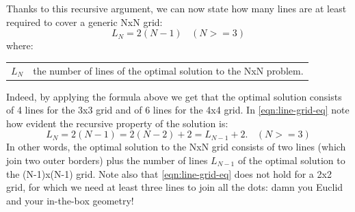 \documentclass[11pt]{article}
\makeatletter
\newenvironment{conditions}
  {\par\vspace{\abovedisplayskip}\noindent\begin{tabular}{>{$}l<{$} @{${}={}$} l}}
  {\end{tabular}\par\vspace{\belowdisplayskip}}
\makeatother
\begin{document}
Thanks to this recursive argument, we can now state how many lines are at least required to cover a generic NxN grid:
\begin{equation}
L_N = 2(N - 1)\ \ \ \  (N >=3)
\label{eqn:line-grid-eq}
\end{equation}
where:
\begin{conditions}
	L_N  &  the number of lines of the optimal solution to the NxN problem.
\end{conditions}
Indeed, by applying the formula above we get that the optimal solution consists of 4 lines for the 3x3 grid and of 6 lines for the 4x4 grid. In \autoref{eqn:line-grid-eq} note how evident the recursive property of the solution is:
\begin{equation}
L_{N} = 2(N-1) = 2(N-2) + 2 = L_{N-1} + 2.\ \ \ \  (N >=3)
\label{eqn:line-grid-eq-recursion}
\end{equation}
In other words, the optimal solution to the NxN grid consists of two lines (which join two outer borders) plus the number of lines $L_{N-1}$ of the optimal solution to the (N-1)x(N-1) grid.
Note also that \autoref{eqn:line-grid-eq} does not hold for a 2x2 grid, for which we need at least three lines to join all the dots: damn you Euclid and your in-the-box geometry!
\end{document}
